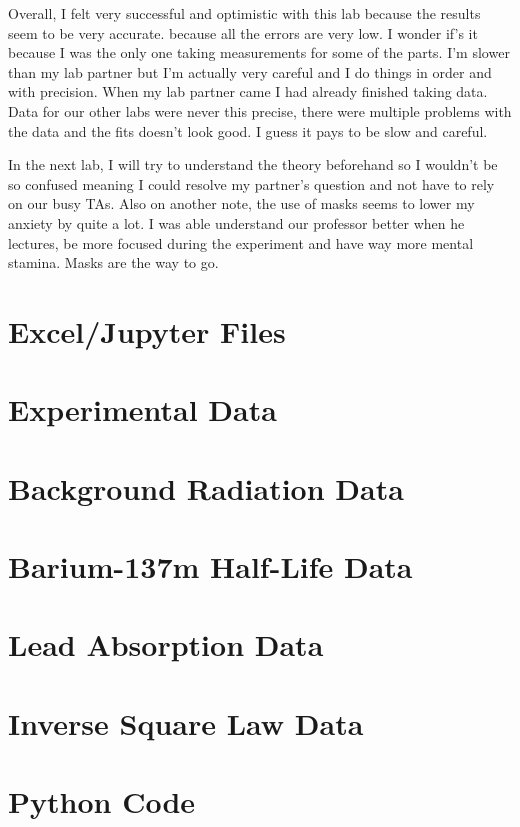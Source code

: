 \documentclass[12pt,letterpaper]{article}
\begin{document}
Overall, I felt very successful and optimistic with 
this lab because the results seem to be very accurate.
because all the errors are very low. I wonder if's it
because I was the only one taking measurements for 
some of the parts. I'm
slower than my lab partner but I'm actually very careful
and I do things in order and with precision. When my lab
partner came I had already finished taking data. Data
for our other labs were never this precise, there were
multiple problems with the data and the fits
doesn't look good. I guess it pays to be slow and 
careful.

In the next lab, I will try to understand the theory
beforehand so I wouldn't be so confused meaning I could
resolve my partner's question and not have to rely on
 our busy TAs. Also on another note, the use of masks
 seems to lower my anxiety by quite a lot. I was able
 understand our professor better when he lectures, be
 more focused during the experiment and have way more
 mental stamina. Masks are the way to go.


\section{Excel/Jupyter Files}




\clearpage
\appendix

\section{Experimental Data}

\section{Background Radiation Data}
\label{app:background}


\section{Barium-137m Half-Life Data}
\label{app:halflife}


\section{Lead Absorption Data}
\label{app:lead}


\section{Inverse Square Law Data}
\label{app:inverse}



\clearpage
\section{Python Code}







\clearpage
\appendix
\end{document}
